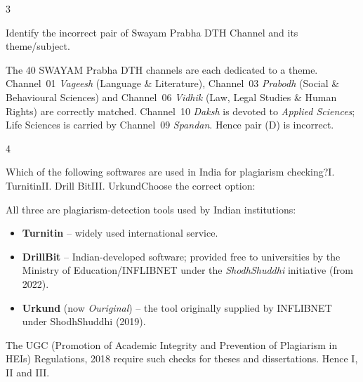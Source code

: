 \begin{question}{3}
{Identify the incorrect pair of Swayam Prabha DTH Channel and its theme/subject.\par}
\begin{explain}
The 40 SWAYAM Prabha DTH channels are each dedicated to a theme. Channel~01 \emph{Vageesh} (Language \& Literature), Channel~03 \emph{Prabodh} (Social \& Behavioural Sciences) and Channel~06 \emph{Vidhik} (Law, Legal Studies \& Human Rights) are correctly matched. Channel~10 \emph{Daksh} is devoted to \emph{Applied Sciences}; Life Sciences is carried by Channel~09 \emph{Spandan}. Hence pair (D) is incorrect.
\end{explain}
\end{question}

\begin{question}{4}
{Which of the following softwares are used in India for plagiarism checking?\newline I. Turnitin\newline II. Drill Bit\newline III. Urkund\newline Choose the correct option:\par}
\begin{explain}
All three are plagiarism-detection tools used by Indian institutions:
\begin{itemize}
\item \textbf{Turnitin} -- widely used international service.
\item \textbf{DrillBit} -- Indian-developed software; provided free to universities by the Ministry of Education/INFLIBNET under the \emph{ShodhShuddhi} initiative (from 2022).
\item \textbf{Urkund} (now \emph{Ouriginal}) -- the tool originally supplied by INFLIBNET under ShodhShuddhi (2019).
\end{itemize}
The UGC (Promotion of Academic Integrity and Prevention of Plagiarism in HEIs) Regulations, 2018 require such checks for theses and dissertations. Hence I, II and III.
\end{explain}
\end{question}

